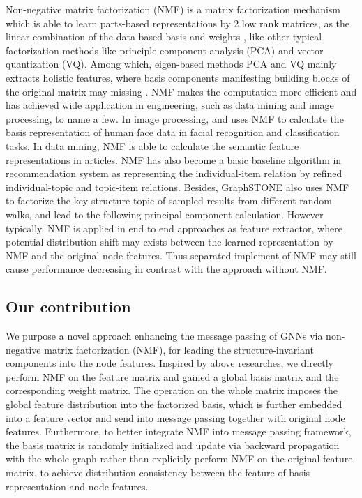 \documentclass[english,onecolumn]{IEEEtran}
\begin{document}
	Non-negative matrix factorization (NMF) is a matrix factorization mechanism which is able to learn parts-based representations by 2 low rank matrices, as the linear combination of the data-based basis and weights \cite{b3}, like other typical factorization methods like principle component analysis (PCA) and vector quantization (VQ). Among which, eigen-based methods PCA and VQ mainly extracts holistic features, where basis components manifesting building blocks of the original matrix may missing \cite{b4}. 
	NMF makes the computation more efficient and has achieved wide application in engineering, such as data mining and image processing, to name a few. In image processing, \cite{b3} and \cite{b4} uses NMF to calculate the basis representation of human face data in facial recognition and classification tasks. In data mining, NMF is able to calculate the semantic feature representations in articles\cite{b3}. NMF has also become a basic baseline algorithm in recommendation system as representing the individual-item relation by refined individual-topic and topic-item relations. Besides, GraphSTONE\cite{b2} also uses NMF to factorize the key structure topic of sampled results from different random walks, and lead to the following principal component calculation. However typically, NMF is applied in end to end approaches as feature extractor,  where potential distribution shift may exists between the learned representation by NMF and the original node features. Thus separated implement of NMF may still cause performance decreasing in contrast with the approach without NMF. 
	
	\subsection{Our contribution}
	We purpose a novel approach enhancing the message passing of GNNs via non-negative matrix factorization (NMF), for leading the structure-invariant components into the node features. Inspired by above researches, we directly perform NMF on the feature matrix and gained a global basis matrix and the corresponding weight matrix. The operation on the whole matrix imposes the global feature distribution into the factorized basis, which is further embedded into a feature vector and send into message passing together with original node features. 
	Furthermore, to better integrate NMF into message passing framework,  the basis matrix is randomly initialized and update via backward propagation with the whole graph rather than explicitly perform NMF on the original feature matrix, to achieve distribution consistency between the feature of basis representation and node features. 
	
\end{document}
